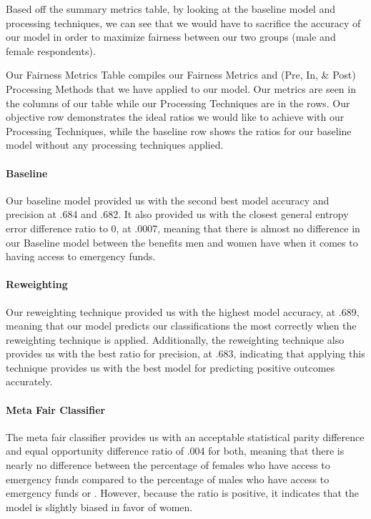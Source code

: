 \documentclass[water,article,submit,moreauthors,pdftex]{mdpi}
\begin{document}
Based off the summary metrics table, by looking at the baseline model
and processing techniques, we can see that we would have to sacrifice
the accuracy of our model in order to maximize fairness between our two
groups (male and female respondents).

Our Fairness Metrics Table compiles our Fairness Metrics and (Pre, In,
\& Post) Processing Methods that we have applied to our model. Our
metrics are seen in the columns of our table while our Processing
Techniques are in the rows. Our objective row demonstrates the ideal
ratios we would like to achieve with our Processing Techniques, while
the baseline row shows the ratios for our baseline model without any
processing techniques applied.

\hypertarget{baseline}{%
\paragraph{Baseline}\label{baseline}}

Our baseline model provided us with the second best model accuracy and
precision at .684 and .682. It also provided us with the closest general
entropy error difference ratio to 0, at .0007, meaning that there is
almost no difference in our Baseline model between the benefits men and
women have when it comes to having access to emergency funds.

\hypertarget{reweighting}{%
\paragraph{Reweighting}\label{reweighting}}

Our reweighting technique provided us with the highest model accuracy,
at .689, meaning that our model predicts our classifications the most
correctly when the reweighting technique is applied. Additionally, the
reweighting technique also provides us with the best ratio for
precision, at .683, indicating that applying this technique provides us
with the best model for predicting positive outcomes accurately.

\hypertarget{meta-fair-classifier}{%
\paragraph{Meta Fair Classifier}\label{meta-fair-classifier}}

The meta fair classifier provides us with an acceptable statistical
parity difference and equal opportunity difference ratio of .004 for
both, meaning that there is nearly no difference between the percentage
of females who have access to emergency funds compared to the percentage
of males who have access to emergency funds or . However, because the
ratio is positive, it indicates that the model is slightly biased in
favor of women.
\end{document}

